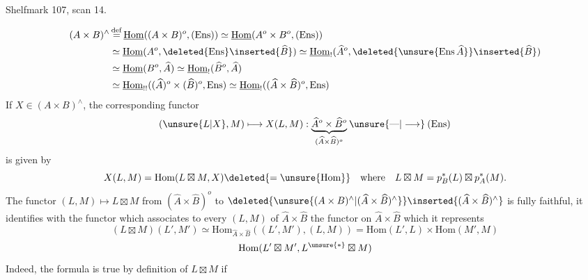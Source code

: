 Shelfmark 107, scan 14.

\[
\begin{aligned}
(A\times B)^\wedge&\mathop{=}\limits^{\mathrm{def}}\underline{\mathrm{Hom}}((A\times B)^o,(\mathrm{Ens}))\simeq\underline{\mathrm{Hom}}(A^o\times B^o,(\mathrm{Ens}))\\
&\simeq\underline{\mathrm{Hom}}(A^o,\deleted{\mathrm{Ens}}\inserted{\widehat B})\simeq\underline{\mathrm{Hom}}_!(\widehat A^o,\deleted{\unsure{\mathrm{Ens}\,\widehat A}}\inserted{\widehat B})\\
&\simeq\underline{\mathrm{Hom}}(B^o,\widehat A)\simeq\underline{\mathrm{Hom}}_!(\widehat B^o,\widehat A)\\
&\simeq\underline{\mathrm{Hom}}_{!!}((\widehat A)^o\times(\widehat B)^o,\mathrm{Ens})\simeq\underline{\mathrm{Hom}}_!((\widehat A\times\widehat B)^o,\mathrm{Ens})
\end{aligned}
\]
If $X\in(A\times B)^\wedge$, the  corresponding functor
\[
(\unsure{L|X},M)\longmapsto X(L,M):\underset{(\widehat A\times\widehat B)^o}{\underbrace{\widehat A^o\times\widehat B^o}}\mathbin{\unsure{\text{---}|\longrightarrow}}(\mathrm{Ens})
\]
is given by
\[
X(L,M)=\mathrm{Hom}(L\boxtimes M,X)\deleted{=\unsure{\mathrm{Hom}}}\quad\text{where}\quad L\boxtimes M=p_B^*(L)\boxtimes p_A^*(M).
\]
 The functor $(L,M)\longmapsto L\boxtimes M$ from $(\widehat A\times\widehat B)^o$ to $\deleted{\unsure{(A\times B)^\wedge|(\widehat A\times\widehat B)^\wedge}}\inserted{(\widehat A\times\widehat B)^\wedge}$ is fully faithful, it identifies with the functor which associates to every  $(L,M)$ of $\widehat A\times\widehat B$ the
 functor  on $\widehat A\times\widehat B$ which it represents
\[
(L\boxtimes M)(L',M')\simeq\mathrm{Hom}_{\widehat A\times\widehat B}((L',M'),(L,M))=\mathrm{Hom}(L',L)\times\mathrm{Hom}(M',M)
\]
\[
\mathrm{Hom}(L'\boxtimes M',L^{\unsure{*}}\boxtimes M)
\]
Indeed, the formula is true by definition of $L\boxtimes M$ if 

